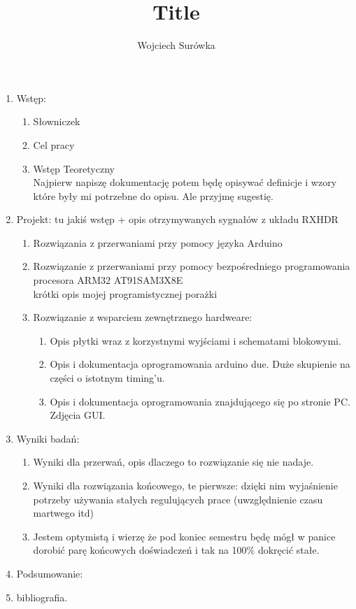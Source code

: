 \documentclass[a4paper,11pt]{article}
\title{Title}
\author{Wojciech Surówka}
\begin{document}
\begin{enumerate}
 \item Wstęp:
 \begin{enumerate}
   \item Słowniczek 
   \item Cel pracy 
   \item Wstęp Teoretyczny \\ Najpierw napiszę dokumentację potem będę opisywać definicje i wzory które były mi potrzebne do opisu. Ale przyjmę sugestię. 
 \end{enumerate}
 \item Projekt: tu jakiś wstęp + opis otrzymywanych sygnałów z układu RXHDR
 \begin{enumerate}
   \item Rozwiązania z przerwaniami przy pomocy języka Arduino
   \item Rozwiązanie z przerwaniami przy pomocy bezpośredniego programowania procesora ARM32 AT91SAM3X8E \\ krótki opis mojej programistycznej porażki
   \item Rozwiązanie z wsparciem zewnętrznego hardweare:
   \begin{enumerate}
     \item Opis płytki wraz z korzystnymi wyjściami i schematami blokowymi.
     \item Opis i dokumentacja oprogramowania arduino due. Duże skupienie na części o istotnym timing'u. 
     \item Opis i dokumentacja oprogramowania znajdującego się po stronie PC. Zdjęcia GUI. 
   \end{enumerate} 
 \end{enumerate}
  \item Wyniki badań:
  \begin{enumerate}
    \item Wyniki dla przerwań, opis dlaczego to rozwiązanie się nie nadaje. 
    \item Wyniki dla rozwiązania końcowego, te pierwsze: dzięki nim wyjaśnienie potrzeby używania stałych regulujących prace (uwzględnienie czasu martwego itd)
    \item Jestem optymistą i wierzę że pod koniec semestru będę mógł w panice dorobić parę końcowych doświadczeń i tak na 100\% dokręcić stałe. 
  \end{enumerate} 
  \item Podsumowanie:

  \item bibliografia.
\end{enumerate}
\end{document}
